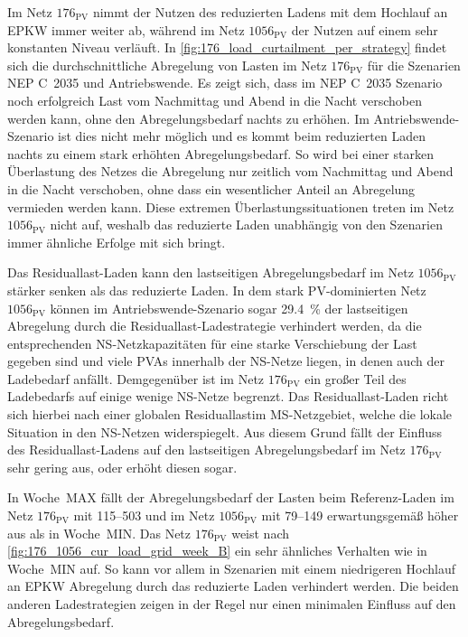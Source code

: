 

Im Netz \(176_{\text{PV}}\) nimmt der Nutzen des reduzierten Ladens mit dem Hochlauf an \gls{EPKW} immer weiter ab, während im Netz \(1056_{\text{PV}}\) der Nutzen auf einem sehr konstanten Niveau verläuft.
In \autoref{fig:176_load_curtailment_per_strategy} findet sich die durchschnittliche Abregelung von Lasten im Netz \(176_{\text{PV}}\) für die Szenarien NEP C~\num{2035} und Antriebswende.
Es zeigt sich, dass im NEP C~\num{2035} Szenario noch erfolgreich Last vom Nachmittag und Abend in die Nacht verschoben werden kann, ohne den Abregelungsbedarf nachts zu erhöhen.
Im Antriebswende-Szenario ist dies nicht mehr möglich und es kommt beim reduzierten Laden nachts zu einem stark erhöhten Abregelungsbedarf.
So wird bei einer starken Überlastung des Netzes die Abregelung nur zeitlich vom Nachmittag und Abend in die Nacht verschoben, ohne dass ein wesentlicher Anteil an Abregelung vermieden werden kann.
Diese extremen Überlastungssituationen treten im Netz \(1056_{\text{PV}}\) nicht auf, weshalb das reduzierte Laden unabhängig von den Szenarien immer ähnliche Erfolge mit sich bringt.



Das Residuallast-Laden kann den lastseitigen Abregelungsbedarf im Netz \(1056_{\text{PV}}\) stärker senken als das reduzierte Laden.
In dem stark \gls{PV}-dominierten Netz \(1056_{\text{PV}}\) können im Antriebswende-Szenario sogar \SI{29.4}{\percent} der lastseitigen Abregelung durch die Residuallast-Ladestrategie verhindert werden, da die entsprechenden \gls{NS}-Netzkapazitäten für eine starke Verschiebung der Last gegeben sind und viele \glspl{PVA} innerhalb der \gls{NS}-Netze liegen, in denen auch der Ladebedarf anfällt.
Demgegenüber ist im Netz \(176_{\text{PV}}\) ein großer Teil des Ladebedarfs auf einige wenige \gls{NS}-Netze begrenzt.
Das Residuallast-Laden richt sich hierbei nach einer globalen Residuallastim \gls{MS}-Netzgebiet, welche die lokale Situation in den \gls{NS}-Netzen widerspiegelt.
Aus diesem Grund fällt der Einfluss des Residuallast-Ladens auf den lastseitigen Abregelungsbedarf im Netz \(176_{\text{PV}}\) sehr gering aus, oder erhöht diesen sogar.\medskip

In Woche~MAX fällt der Abregelungsbedarf der Lasten beim Referenz-Laden im Netz \(176_{\text{PV}}\) mit \SIrange{115}{503}{\mwh} und im Netz \(1056_{\text{PV}}\) mit \SIrange{79}{149}{\mwh} erwartungsgemäß höher aus als in Woche~MIN.
Das Netz \(176_{\text{PV}}\) weist nach \autoref{fig:176_1056_cur_load_grid_week_B} ein sehr ähnliches Verhalten wie in Woche~MIN auf.
So kann vor allem in Szenarien mit einem niedrigeren Hochlauf an \gls{EPKW} Abregelung durch das reduzierte Laden verhindert werden.
Die beiden anderen Ladestrategien zeigen in der Regel nur einen minimalen Einfluss auf den Abregelungsbedarf.\medskip

